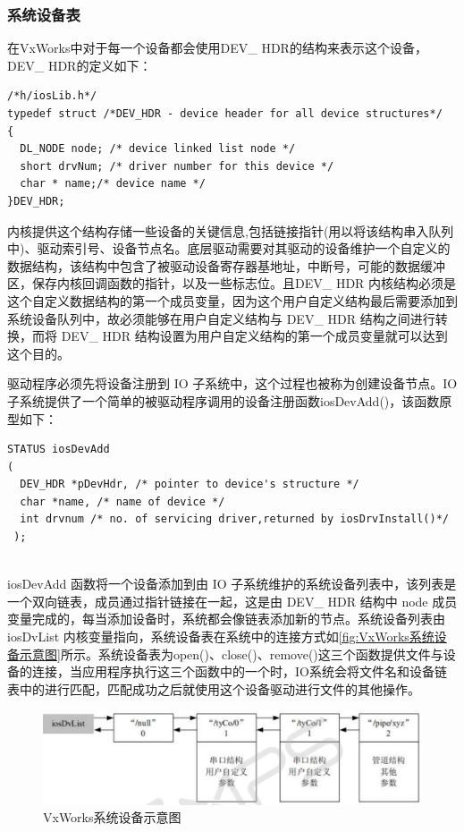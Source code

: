 \subsubsection{系统设备表}
	
	在VxWorks中对于每一个设备都会使用DEV\_ HDR的结构来表示这个设备，DEV\_ HDR的定义如下：
\lstset{language=C}
\begin{lstlisting}
/*h/iosLib.h*/
typedef struct /*DEV_HDR - device header for all device structures*/ 
{ 
  DL_NODE node; /* device linked list node */ 
  short drvNum; /* driver number for this device */ 
  char * name;/* device name */ 
}DEV_HDR;  
\end{lstlisting}

	内核提供这个结构存储一些设备的关键信息,包括链接指针(用以将该结构串入队列中)、驱动索引号、设备节点名。底层驱动需要对其驱动的设备维护一个自定义的数据结构，该结构中包含了被驱动设备寄存器基地址，中断号，可能的数据缓冲区，保存内核回调函数的指针，以及一些标志位。且DEV\_ HDR 内核结构必须是这个自定义数据结构的第一个成员变量，因为这个用户自定义结构最后需要添加到系统设备队列中，故必须能够在用户自定义结构与 DEV\_ HDR 结构之间进行转换，而将 DEV\_ HDR 结构设置为用户自定义结构的第一个成员变量就可以达到这个目的。
	
	
	驱动程序必须先将设备注册到 IO 子系统中，这个过程也被称为创建设备节点。IO子系统提供了一个简单的被驱动程序调用的设备注册函数iosDevAdd()，该函数原型如下：
\lstset{language=C}
\begin{lstlisting}
STATUS iosDevAdd 
( 
  DEV_HDR *pDevHdr, /* pointer to device's structure */ 
  char *name, /* name of device */ 
  int drvnum /* no. of servicing driver,returned by iosDrvInstall()*/
 ); 
\end{lstlisting}\\
iosDevAdd 函数将一个设备添加到由 IO 子系统维护的系统设备列表中，该列表是一个双向链表，成员通过指针链接在一起，这是由 DEV\_ HDR 结构中 node 成员变量完成的，每当添加设备时，系统都会像链表添加新的节点。系统设备列表由 iosDvList 内核变量指向，系统设备表在系统中的连接方式如\autoref{fig:VxWorks系统设备示意图}所示。系统设备表为open()、close()、remove()这三个函数提供文件与设备的连接，当应用程序执行这三个函数中的一个时，IO系统会将文件名和设备链表中的进行匹配，匹配成功之后就使用这个设备驱动进行文件的其他操作。

\begin{figure}[!h]
\centering
\includegraphics[width=1.0\textwidth]{./graphics/vxworks-device-link.pdf}
\caption{VxWorks系统设备示意图}\label{fig:VxWorks系统设备示意图}
\end{figure}


